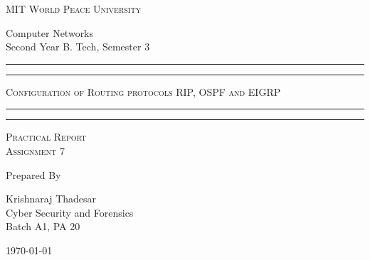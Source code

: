 \documentclass[11pt]{article}
\begin{document}
	
	\begin{titlepage} 
		\centering 
		
		
		\huge\textsc{
			MIT World Peace University
		}\\
	
		\vspace{0.75\baselineskip} %
		
		\LARGE{
			Computer Networks\\
			Second Year B. Tech, Semester 3
		}
		
		\vfill %
		
		
		\rule{\textwidth}{1.6pt}\vspace*{-\baselineskip}\vspace*{2pt}
		\rule{\textwidth}{0.6pt}
		\vspace{0.75\baselineskip} %
		
		
		
		\huge{\textsc{
			Configuration of Routing protocols RIP, OSPF and EIGRP
			}} \\
		
		
		
		\vspace{0.5\baselineskip} %
		\rule{\textwidth}{0.6pt}\vspace*{-\baselineskip}\vspace*{2.8pt}
		\rule{\textwidth}{1.6pt}
		
		\vspace{1\baselineskip} %

			
		\LARGE\textsc{
			Practical Report\\
			Assignment 7
		} %
		\vfill
		
		
		Prepared By
		\vspace{0.5\baselineskip} %
		
		\Large{
			Krishnaraj Thadesar \\
			Cyber Security and Forensics\\
			Batch A1, PA 20
					}
		
		
		\vspace{0.5\baselineskip} %
		\today

	\end{titlepage}
	
\end{document}
